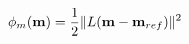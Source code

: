 \vspace{-0.1cm}
\begin{equation}
    \phi_{m}(\mathbf{m}) = \frac{1}{2} \| L (\mathbf{m} - \mathbf{m}_{ref}) \|^{2}
    \label{eq:forward-pass}
    \vspace{-0.05cm}
\end{equation}